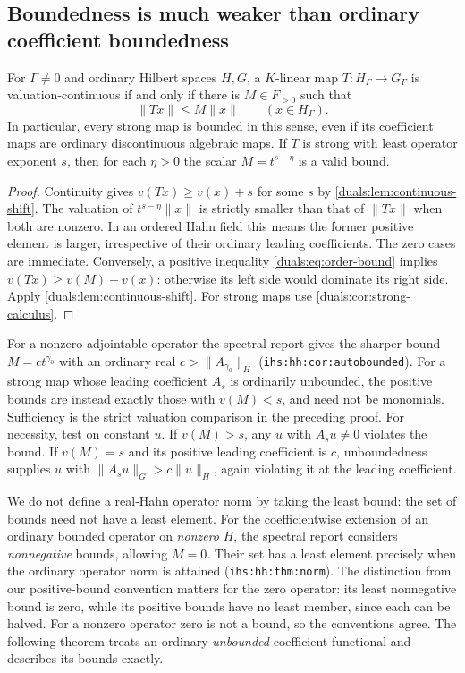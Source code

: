 \documentclass[11pt,letterpaper]{article}
\numberwithin{equation}{section}
\theoremstyle{definition}
\theoremstyle{remark}
\newcommand{\norm}[1]{\lVert#1\rVert}
\newcommand{\ihs}[1]{\texttt{ihs:#1}}
\begin{document}
\subsection{Boundedness is much weaker than ordinary coefficient boundedness}
\begin{proposition}
\label{duals:prop:order-bound}
For $\Gamma\ne0$ and ordinary Hilbert spaces $H,G$, a $K$-linear map
$T:H_\Gamma\to G_\Gamma$ is valuation-continuous if and only if
there is $M\in F_{>0}$ such that
\begin{equation}\label{duals:eq:order-bound}
 \norm{Tx}\le M\norm{x}\qquad(x\in H_\Gamma).
\end{equation}
In particular, every strong map is bounded in this sense, even if its
coefficient maps are ordinary discontinuous algebraic maps.
If $T$ is strong with least operator exponent $s$, then for each
$\eta>0$ the scalar $M=t^{s-\eta}$ is a valid bound.
\end{proposition}
\begin{proof}
Continuity gives $v(Tx)\ge v(x)+s$ for some $s$ by
\cref{duals:lem:continuous-shift}. The valuation of
$t^{s-\eta}\norm{x}$ is strictly smaller than that of $\norm{Tx}$
when both are nonzero. In an ordered Hahn field this means the former
positive element is larger, irrespective of their ordinary leading
coefficients. The zero cases are immediate.
Conversely, a positive inequality \eqref{duals:eq:order-bound} implies
$v(Tx)\ge v(M)+v(x)$: otherwise its left side would dominate its right
side. Apply \cref{duals:lem:continuous-shift}. For strong maps use
\cref{duals:cor:strong-calculus}.
\end{proof}

For a nonzero adjointable operator the spectral report gives the
sharper bound $M=ct^{\gamma_0}$ with an ordinary real
$c>\norm{A_{\gamma_0}}_H$ (\ihs{hh:cor:autobounded}). For a strong
map whose leading coefficient $A_s$ is ordinarily unbounded, the
positive bounds are instead exactly those with $v(M)<s$, and need
not be monomials. Sufficiency is the strict valuation comparison in
the preceding proof. For necessity, test on constant $u$. If
$v(M)>s$, any $u$ with $A_su\ne0$ violates the bound. If $v(M)=s$
and its positive leading coefficient is $c$, unboundedness supplies
$u$ with $\norm{A_su}_G>c\norm{u}_H$, again violating it at the
leading coefficient.

We do not define a real-Hahn operator norm by taking the least bound:
the set of bounds need not have a least element. For the coefficientwise
extension of an ordinary bounded operator on \emph{nonzero} $H$, the
spectral report considers \emph{nonnegative} bounds, allowing $M=0$.
Their set has a least element precisely when the ordinary operator norm
is attained (\ihs{hh:thm:norm}). The distinction from our positive-bound
convention matters for the zero operator: its least nonnegative bound
is zero, while its positive bounds have no least member, since each
can be halved. For a nonzero operator zero is not a bound, so the
conventions agree. The following theorem treats an ordinary
\emph{unbounded} coefficient functional and describes its bounds exactly.
\end{document}
